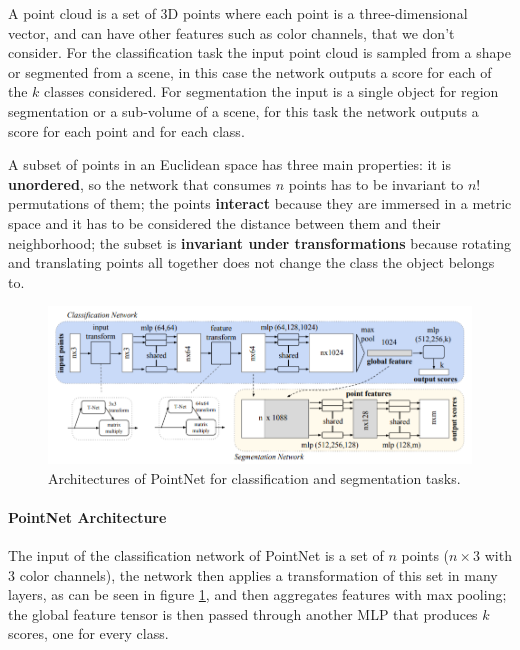 A point cloud is a set of 3D points where each point is a three-dimensional vector, and can have other features such as color channels, that we don't consider. For the classification task the input point cloud is sampled from a shape or segmented from a scene, in this case the network outputs a score for each of the $k$ classes considered. For segmentation the input is a single object for region segmentation or a sub-volume of a scene, for this task the network outputs a score for each point and for each class.

A subset of points in an Euclidean space has three main properties: it is \textbf{unordered}, so the network that consumes $n$ points has to be invariant to $n!$ permutations of them; the points \textbf{interact} because they are immersed in a metric space and it has to be considered the distance between them and their neighborhood; the subset is \textbf{invariant under transformations} because rotating and translating points all together does not change the class the object belongs to.

\begin{figure}[ht]
    \centering
    \includegraphics[width=\textwidth]{images/pointnet_architecture.png}
    \caption{Architectures of PointNet for classification and segmentation tasks.}
    \label{fig:pointnet_architecture}
\end{figure}

\paragraph{PointNet Architecture}

The input of the classification network of PointNet is a set of $n$ points ($n \times 3$ with 3 color channels), the network then applies a transformation of this set in many layers, as can be seen in figure \ref{fig:pointnet_architecture}, and then aggregates features with max pooling; the global feature tensor is then passed through another MLP that produces $k$ scores, one for every class.

